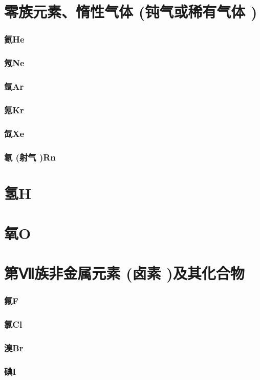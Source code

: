 \documentclass[UTF8]{../03-Chemistry}
\begin{document}
\section{零族元素、惰性气体 (钝气或稀有气体 )}
    \subsubsection{氦He}
    \subsubsection{氖Ne}
    \subsubsection{氩Ar}
    \subsubsection{氪Kr}
    \subsubsection{氙Xe}
    \subsubsection{氡 (射气 )Rn}
\section{氢H}
\section{氧O}
\section{第Ⅶ族非金属元素 (卤素 )及其化合物}
    \subsubsection{氟F}
    \subsubsection{氯Cl}
    \subsubsection{溴Br}
    \subsubsection{碘I}
\end{document}

